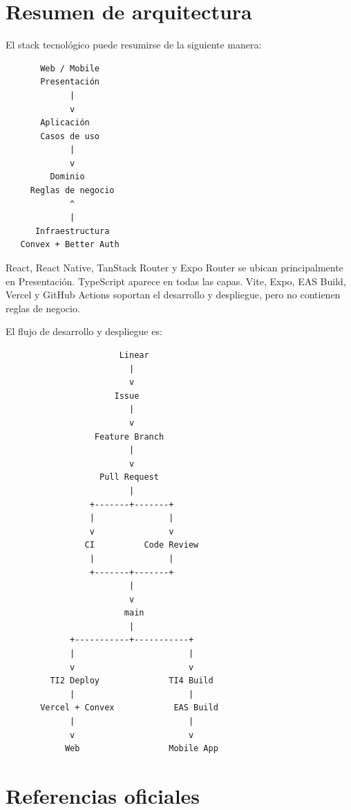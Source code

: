 \documentclass[11pt,a4paper]{article}
\begin{document}
\section{Resumen de arquitectura}

El stack tecnológico puede resumirse de la siguiente manera:

\begin{lstlisting}
       Web / Mobile
       Presentación
             |
             v
       Aplicación
       Casos de uso
             |
             v
         Dominio
     Reglas de negocio
             ^
             |
      Infraestructura
   Convex + Better Auth
\end{lstlisting}

React, React Native, TanStack Router y Expo Router se ubican principalmente en
Presentación. TypeScript aparece en todas las capas. Vite, Expo, EAS Build,
Vercel y GitHub Actions soportan el desarrollo y despliegue, pero no contienen
reglas de negocio.

El flujo de desarrollo y despliegue es:

\begin{lstlisting}
                       Linear
                         |
                         v
                      Issue
                         |
                         v
                  Feature Branch
                         |
                         v
                   Pull Request
                         |
                 +-------+-------+
                 |               |
                 v               v
                CI          Code Review
                 |               |
                 +-------+-------+
                         |
                         v
                        main
                         |
             +-----------+-----------+
             |                       |
             v                       v
         TI2 Deploy              TI4 Build
             |                       |
       Vercel + Convex            EAS Build
             |                       |
             v                       v
            Web                  Mobile App
\end{lstlisting}

\section{Referencias oficiales}
\end{document}
